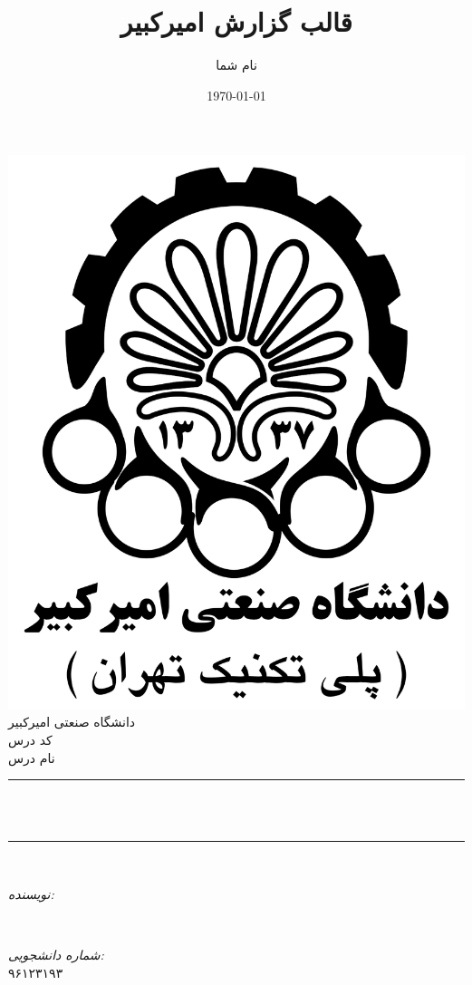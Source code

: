\documentclass[12pt]{article}
\title{قالب گزارش امیرکبیر}                             %
\author{نام شما}                               %
\date{\today}                                           %
\makeatletter
\let\thetitle\@title
\let\theauthor\@author
\makeatother
\begin{document}

\begin{titlepage}
    \centering
    \vspace*{0.5 cm}
    \includegraphics[scale = 0.1]{logo.png}\\[1.0 cm]   %
    \textsc{\LARGE دانشگاه صنعتی امیرکبیر}\\[2.0 cm]   %
    \textsc{\Large کد درس}\\[0.5 cm]               %
    \textsc{\large نام درس}\\[0.5 cm]               %
    \rule{\linewidth}{0.2 mm} \\[0.4 cm]
    { \huge \bfseries \thetitle}\\
    \rule{\linewidth}{0.2 mm} \\[1.5 cm]
    
    \begin{minipage}{0.4\textwidth}
        \begin{flushright} \large
            \emph{نویسنده:}\\
            \theauthor
        \end{flushright}
    \end{minipage}~
    \begin{minipage}{0.4\textwidth}
        \begin{flushleft} \large
            \emph{شماره دانشجویی:} \\
            ۹۶۱۲۳۱۹۳                                   %
        \end{flushleft}
    \end{minipage}\\[2 cm]
    

\end{titlepage}
\end{document}
